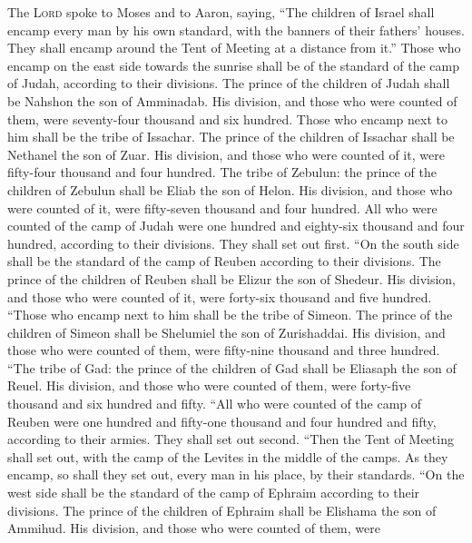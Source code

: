  The \textsc{Lord} spoke to Moses and to Aaron, saying,
 ``The children of Israel shall encamp every man by his
own standard, with the banners of their fathers' houses. They shall
encamp around the Tent of Meeting at a distance from it.''
 Those who encamp on the east side towards the sunrise
shall be of the standard of the camp of Judah, according to their
divisions. The prince of the children of Judah shall be Nahshon the son
of Amminadab.  His division, and those who were counted of
them, were seventy-four thousand and six hundred.  Those
who encamp next to him shall be the tribe of Issachar. The prince of the
children of Issachar shall be Nethanel the son of Zuar. 
His division, and those who were counted of it, were fifty-four thousand
and four hundred.  The tribe of Zebulun: the prince of the
children of Zebulun shall be Eliab the son of Helon.  His
division, and those who were counted of it, were fifty-seven thousand
and four hundred.  All who were counted of the camp of
Judah were one hundred and eighty-six thousand and four hundred,
according to their divisions. They shall set out first. 
``On the south side shall be the standard of the camp of Reuben
according to their divisions. The prince of the children of Reuben shall
be Elizur the son of Shedeur.  His division, and those
who were counted of it, were forty-six thousand and five hundred.
 ``Those who encamp next to him shall be the tribe of
Simeon. The prince of the children of Simeon shall be Shelumiel the son
of Zurishaddai.  His division, and those who were counted
of them, were fifty-nine thousand and three hundred. 
``The tribe of Gad: the prince of the children of Gad shall be Eliasaph
the son of Reuel.  His division, and those who were
counted of them, were forty-five thousand and six hundred and fifty.
 ``All who were counted of the camp of Reuben were one
hundred and fifty-one thousand and four hundred and fifty, according to
their armies. They shall set out second.  ``Then the Tent
of Meeting shall set out, with the camp of the Levites in the middle of
the camps. As they encamp, so shall they set out, every man in his
place, by their standards.  ``On the west side shall be
the standard of the camp of Ephraim according to their divisions. The
prince of the children of Ephraim shall be Elishama the son of Ammihud.
 His division, and those who were counted of them, were
